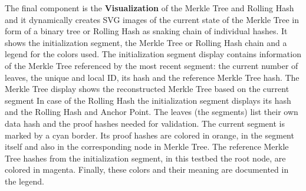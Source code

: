 The final component is the \textbf{Visualization} of the Merkle Tree and Rolling Hash and it dynamically creates SVG images of the current state of the Merkle Tree in form of a binary tree or Rolling Hash as snaking chain of individual hashes. It shows the initialization segment, the Merkle Tree or Rolling Hash chain and a legend for the colors used. The initialization segment display contains information of the Merkle Tree referenced by the most recent segment: the current number of leaves, the unique and local ID, its hash and the reference Merkle Tree hash. The Merkle Tree display shows the reconstructed Merkle Tree based on the current segment In case of the Rolling Hash the initialization segment displays its hash and the Rolling Hash and Anchor Point. The leaves (the segments) list their own data hash and the proof hashes needed for validation. The current segment is marked by a cyan border. Its proof hashes are colored in orange, in the segment itself and also in the corresponding node in Merkle Tree. The reference Merkle Tree hashes from the initialization segment, in this testbed the root node, are colored in magenta. Finally, these colors and their meaning are documented in the legend.
